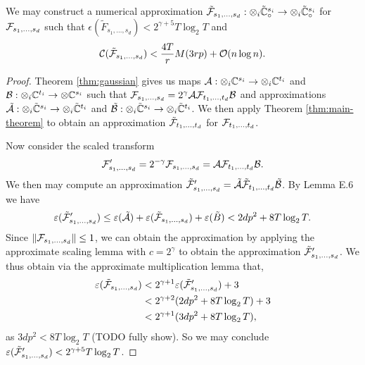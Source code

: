 \begin{proposition}
    We may construct a numerical approximation $\tilde{\mathcal F}_{s_1, \ldots, s_d}: \otimes_i \tilde{{\mathbb C}}_\circ^{s_i} \to \otimes_i \tilde{{\mathbb C}}_\circ^{s_i}$ for $\mathcal F_{s_1, \ldots, s_d}$ such that $\epsilon(\tilde{F}_{s_1, \ldots, s_d}) < 2^{\gamma + 5} T \log_2 T$ and
    \[
        \mathcal C(\tilde{\mathcal F}_{s_1, \ldots, s_d}) < \frac{4T}{r} M(3rp) + \mathcal O(n \log n).
    \]
\end{proposition}

\begin{proof}
    Theorem \ref{thm:gaussian} gives us maps $\mathcal A: \otimes_i {\mathbb C}^{s_i} \to \otimes_i {\mathbb C}^{t_i}$ and $\mathcal B: \otimes_i {\mathbb C}^{t_i} \to \otimes {\mathbb C}^{s_i}$ such that $\mathcal F_{s_1, \ldots, s_d} = 2^\gamma \mathcal A\mathcal F_{t_1, \ldots, t_d} \mathcal B$ and approximations $\tilde{\mathcal A}: \otimes_i \tilde{{\mathbb C}}^{s_i} \to \otimes_i \tilde{{\mathbb C}}^{t_i}$ and $\tilde{\mathcal B}: \otimes_i \tilde{{\mathbb C}}^{s_i} \to \otimes_i \tilde{{\mathbb C}}^{t_i}$. We then apply Theorem \ref{thm:main-theorem} to obtain an approximation $\tilde{\mathcal F}_{t_1, \ldots, t_d}$ for $\mathcal F_{t_1, \ldots, t_d}$.

    Now consider the scaled transform
    \[
        \mathcal F^\prime_{s_1, \ldots, s_d} = 2^{-\gamma} \mathcal F_{s_1, \ldots, s_d} = \mathcal A\mathcal F_{t_1, \ldots, t_d}\mathcal B.
    \]
    We then may compute an approximation $\tilde{\mathcal F}^\prime_{s_1, \ldots, s_d} = \tilde{\mathcal A}\tilde{\mathcal F}_{t_1, \ldots, t_d}\tilde{\mathcal B}$. By Lemma E.6 we have
    \[
        \varepsilon(\tilde{\mathcal F}^\prime_{s_1, \ldots, s_d}) \le \varepsilon(\tilde{\mathcal A}) + \varepsilon(\tilde{\mathcal F}_{s_1, \ldots, s_d}) + \varepsilon(\tilde{B}) < 2dp^2 + 8T\log_2 T.
    \]
    Since $\|\mathcal F_{s_1, \ldots, s_d}\| \le 1$, we can obtain the approximation by applying the approximate scaling lemma with $c =  2^\gamma$ to obtain the approximation $\tilde{\mathcal F}_{s_1, \ldots, s_d}^\prime$. We thus obtain via the approximate multiplication lemma that,
    \begin{align*}
        \varepsilon(\tilde{\mathcal F}_{s_1, \ldots, s_d}) &< 2^{\gamma + 1} \varepsilon(\tilde{\mathcal F}_{s_1, \ldots, s_d}^\prime) + 3\\
                                                      &< 2^{\gamma + 2}(2dp^2 + 8T \log_2 T) + 3\\
                                                      &< 2^{\gamma + 1}(3dp^2 + 8T\log_2 T),
    \end{align*}
    as $3dp^2 < 8T \log_2 T$ (TODO fully show).
    So we may conclude $\varepsilon(\tilde{\mathcal F}_{s_1, \ldots, s_d}^\prime) < 2^{\gamma + 5}T\log_2 T$.


\end{proof}
